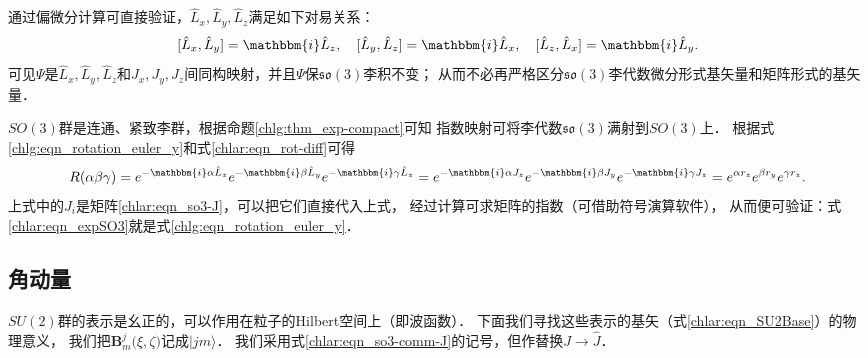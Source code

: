 通过偏微分计算可直接验证，$\hat{L}_x, \hat{L}_y, \hat{L}_z$满足如下对易关系：
\begin{equation}\label{chlar:eqn_so3-comm-L}
    [\hat{L}_x, \hat{L}_y] = \mathbbm{i} \hat{L}_z,\quad
    [\hat{L}_y, \hat{L}_z] = \mathbbm{i} \hat{L}_x,\quad
    [\hat{L}_z, \hat{L}_x] = \mathbbm{i} \hat{L}_y.
\end{equation}
可见$\Psi$是$\hat{L}_x, \hat{L}_y, \hat{L}_z$和$J_x, J_y, J_z$间同构映射，并且$\Psi$保$\mathfrak{so}(3)$李积不变；
从而不必再严格区分$\mathfrak{so}(3)$李代数微分形式基矢量和矩阵形式的基矢量．

$SO(3)$群是连通、紧致李群，根据命题\ref{chlg:thm_exp-compact}可知
指数映射可将李代数$\mathfrak{so}(3)$满射到$SO(3)$上．
根据式\eqref{chlg:eqn_rotation_euler_y}和式\eqref{chlar:eqn_rot-diff}可得
\begin{equation}\label{chlar:eqn_expSO3}
        R(\alpha\beta\gamma) %
        =e^{-\mathbbm{i} \alpha \hat{L}_z} e^{-\mathbbm{i}\beta \hat{L}_y} e^{-\mathbbm{i}\gamma \hat{L}_z}
        =e^{-\mathbbm{i} \alpha J_z} e^{-\mathbbm{i}\beta J_y} e^{-\mathbbm{i}\gamma J_z}
        =e^{\alpha r_z} e^{\beta r_y} e^{\gamma r_z} .
\end{equation}
上式中的$J_i$是矩阵\eqref{chlar:eqn_so3-J}，可以把它们直接代入上式，
经过计算可求矩阵的指数（可借助符号演算软件），
从而便可验证：式\eqref{chlar:eqn_expSO3}就是式\eqref{chlg:eqn_rotation_euler_y}．



\subsection{角动量}\label{chlar:sec_J}
$SU(2)$群的表示是幺正的，可以作用在粒子的Hilbert空间上（即波函数）．
下面我们寻找这些表示的基矢（式\eqref{chlar:eqn_SU2Base}）的物理意义，
我们把$\boldsymbol{B}^j_m\bigl(\xi,\zeta\bigr)$记成$|jm\rangle$．
我们采用式\eqref{chlar:eqn_so3-comm-J}的记号，但作替换$J\to \hat{J}$．




